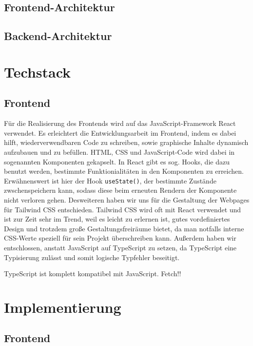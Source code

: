 \documentclass[conference,a4paper,flushend]{cs-techrep}
\begin{document}
\subsection{Frontend-Architektur}


\subsection{Backend-Architektur}

\section{Techstack}
\subsection{Frontend}
Für die Realisierung des Frontends wird auf das JavaScript-Framework React verwendet. Es erleichtert die Entwicklungsarbeit im Frontend, indem es dabei hilft, wiederverwendbaren Code zu schreiben, sowie graphische Inhalte dynamisch aufzubauen und zu befüllen. HTML, CSS und JavaScript-Code wird dabei in sogenannten Komponenten gekapselt. In React gibt es sog. Hooks, die dazu benutzt werden, bestimmte Funktionialitäten in den Komponenten zu erreichen. Erwähnenswert ist hier der Hook \texttt{useState()}, der bestimmte Zustände zwschenspeichern kann, sodass diese beim erneuten Rendern der Komponente nicht verloren gehen. Desweiteren haben wir uns für die Gestaltung der Webpages für Tailwind CSS entschieden. Tailwind CSS wird oft mit React verwendet und ist zur Zeit sehr im Trend, weil es leicht zu erlernen ist, gutes vordefiniertes Design und trotzdem große Gestaltungsfreiräume bietet, da man notfalls interne CSS-Werte speziell für sein Projekt überschreiben kann. Außerdem haben wir entschlossen, anstatt JavaScript auf TypeScript zu setzen, da TypeScript eine Typisierung zulässt und somit logische Typfehler beseitigt. 

TypeScript ist komplett kompatibel mit JavaScript.
Fetch!!

\section{Implementierung}
\subsection{Frontend}
\end{document}
